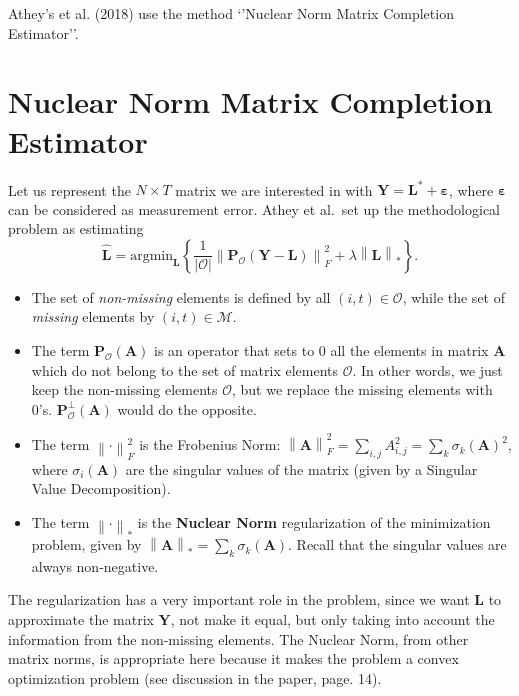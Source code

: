 \documentclass[11pt]{article}
\providecommand{\tightlist}{%
      \setlength{\itemsep}{0pt}\setlength{\parskip}{0pt}}
\begin{document}
    Athey's et al. (2018) use the method `'Nuclear Norm Matrix Completion
Estimator''.

    \hypertarget{nuclear-norm-matrix-completion-estimator}{%
\section{Nuclear Norm Matrix Completion
Estimator}\label{nuclear-norm-matrix-completion-estimator}}

    Let us represent the \(N\times T\) matrix we are interested in with
\(\mathbf{Y}=\mathbf{L^*}+\boldsymbol{\varepsilon}\), where
\(\boldsymbol{\varepsilon}\) can be considered as measurement error.
Athey et al.~set up the methodological problem as estimating \[
\widehat{\mathbf{L}}=\mathrm{arg min}_{\mathbf{L}}\left\{\frac{1}{\left|\mathcal{O}\right|}\left\| \mathbf{P}_{\mathcal{O}}(\mathbf{Y}-\mathbf{L}) \right\|_{F}^2 + \lambda \left\| \mathbf{L} \right\|_{*} \right\}.
\]

\begin{itemize}
\tightlist
\item
  The set of \emph{non-missing} elements is defined by all
  \((i,t)\in\mathcal{O}\), while the set of \emph{missing} elements by
  \((i,t)\in\mathcal{M}\).
\item
  The term \(\mathbf{P}_{\mathcal{O}}(\mathbf{A})\) is an operator that
  sets to \(0\) all the elements in matrix \(\mathbf{A}\) which do not
  belong to the set of matrix elements \(\mathcal{O}\). In other words,
  we just keep the non-missing elements \(\mathcal{O}\), but we replace
  the missing elements with 0's.
  \(\mathbf{P}_{\mathcal{O}}^{\bot}(\mathbf{A})\) would do the opposite.
\item
  The term \(\left\| \cdot \right\|_{F}^2\) is the Frobenius Norm:
  \(\left\| \mathbf{A} \right\|_{F}^2 = \sum_{i,j}A_{i,j}^2=\sum_k\sigma_k(\mathbf{A})^2\),
  where \(\sigma_i(\mathbf{A})\) are the singular values of the matrix
  (given by a Singular Value Decomposition).
\item
  The term \(\left\| \cdot \right\|_{*}\) is the \textbf{Nuclear Norm}
  regularization of the minimization problem, given by
  \(\left\| \mathbf{A} \right\|_{*} = \sum_k\sigma_k(\mathbf{A})\).
  Recall that the singular values are always non-negative.
\end{itemize}

    The regularization has a very important role in the problem, since we
want \(\mathbf{L}\) to approximate the matrix \(\mathbf{Y}\), not make
it equal, but only taking into account the information from the
non-missing elements. The Nuclear Norm, from other matrix norms, is
appropriate here because it makes the problem a convex optimization
problem (see discussion in the paper, page. 14).
\end{document}
